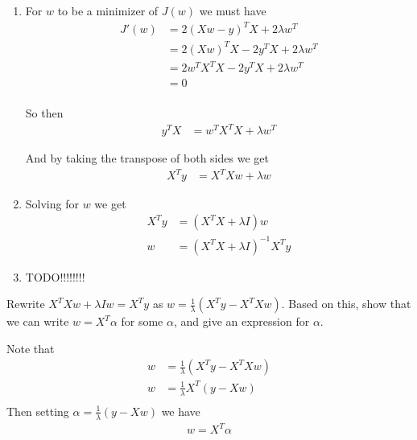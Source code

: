 \documentclass[12pt,letterpaper]{article}
\begin{document}
\begin{solution}{}
$\,$
\begin{enumerate}
    \item For $w$ to be a minimizer of $J(w)$ we must have 
    \begin{align*}
        J'(w) &= 2(Xw-y)^TX + 2\lambda w^T\\
        &= 2(Xw)^TX - 2y^TX + 2\lambda w^T\\
        &= 2w^TX^TX - 2y^TX + 2\lambda w^T\\
        &= 0\\
    \end{align*}
    
    So then 
    \begin{align*}
        y^TX &= w^TX^TX + \lambda w^T
    \end{align*}
    
    And by taking the transpose of both sides we get 
    \begin{align*}
        X^Ty &= X^TXw + \lambda w
    \end{align*}
    
    \item Solving for $w$ we get
    \begin{align*}
        X^Ty &= (X^TX + \lambda I)w\\
        w &= (X^TX + \lambda I)^{-1}X^Ty
    \end{align*}
    
    \item TODO!!!!!!!!
\end{enumerate}
\end{solution}
\newpage

\begin{problem}{3.2}
    Rewrite $X^{T}Xw+\lambda Iw=X^{T}y$ as $w=\frac{1}{\lambda}(X^{T}y-X^{T}Xw)$.
    Based on this, show that we can write $w=X^{T}\alpha$ for some $\alpha$,
    and give an expression for $\alpha$.
\end{problem}
\begin{solution}{}
    Note that
    \begin{align*}
        w &= \frac{1}{\lambda} (X^Ty - X^TXw)\\
        w &= \frac{1}{\lambda}X^T(y-Xw)\\
    \end{align*}
    Then setting $\alpha = \frac{1}{\lambda}(y-Xw)$ we have
    \begin{align*}
        w=X^{T}\alpha
    \end{align*}
\end{solution}
\newpage
\end{document}
